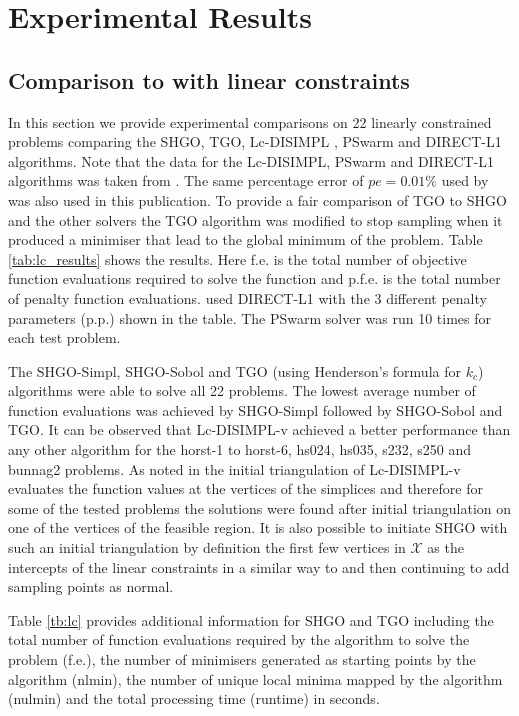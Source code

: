 \section{Experimental Results} \label{sec:results}
\subsection{Comparison to with linear constraints}

In this section we provide experimental comparisons on 22 linearly constrained problems comparing the SHGO, TGO, Lc-DISIMPL \cite{Paul2016}, PSwarm \cite{Vaz2008} and DIRECT-L1 \cite{finkel2003direct} algorithms. Note that the data for the Lc-DISIMPL, PSwarm and DIRECT-L1 algorithms was taken from \cite{Paul2016}. The same percentage error of $pe = 0.01\%$ used by \cite{Paul2016} was also used in this publication. To provide a fair comparison of TGO to SHGO and the other solvers the TGO algorithm was modified to stop sampling when it produced a minimiser that lead to the global minimum of the problem. Table \ref{tab:lc_results} shows the results. Here f.e. is the total number of objective function evaluations required to solve the function and p.f.e. is the total number of penalty function evaluations. \cite{Paul2016} used DIRECT-L1 with the 3 different penalty parameters (p.p.) shown in the table. The PSwarm solver was run 10 times for each test problem. 

The SHGO-Simpl, SHGO-Sobol and TGO (using Henderson's formula for $k_c$) algorithms were able to solve all 22 problems. The lowest average number of function evaluations was achieved by SHGO-Simpl followed by SHGO-Sobol and TGO. It can be observed that Lc-DISIMPL-v achieved a better performance than any other algorithm for the horst-1 to horst-6, hs024, hs035, s232, s250 and bunnag2 problems. As noted in \cite{Paul2016} the initial triangulation of Lc-DISIMPL-v evaluates the function values at the vertices of the simplices and therefore for some of the tested problems the solutions were found after initial triangulation on one of the vertices of the feasible region. It is also possible to initiate SHGO with such an initial triangulation by definition the first few vertices in $\mathcal{X}$ as the intercepts of the linear constraints in a similar way to \cite{Paul2016} and then continuing to add sampling points as normal.

Table \ref{tb:lc} provides additional information for SHGO and TGO including the total number of function evaluations required by the algorithm to solve the problem (f.e.), the number of minimisers generated as starting points by the algorithm (nlmin), the number of unique local minima mapped by the algorithm (nulmin) and the total processing time (runtime) in seconds.

